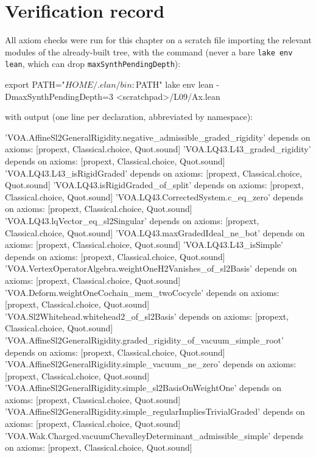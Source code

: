 \section{Verification record}\label{l09:sec:verification}

All axiom checks were run for this chapter on a scratch file importing the relevant modules of the
already-built tree, with the command (never a bare \texttt{lake env lean}, which can drop
\texttt{maxSynthPendingDepth}):

\begin{plaincode}
export PATH="$HOME/.elan/bin:$PATH"
lake env lean -DmaxSynthPendingDepth=3 <scratchpad>/L09/Ax.lean
\end{plaincode}

with output (one line per declaration, abbreviated by namespace):

\begin{plaincode}
'VOA.AffineSl2GeneralRigidity.negative_admissible_graded_rigidity' depends on axioms: [propext, Classical.choice, Quot.sound]
'VOA.LQ43.L43_graded_rigidity' depends on axioms: [propext, Classical.choice, Quot.sound]
'VOA.LQ43.L43_isRigidGraded' depends on axioms: [propext, Classical.choice, Quot.sound]
'VOA.LQ43.isRigidGraded_of_split' depends on axioms: [propext, Classical.choice, Quot.sound]
'VOA.LQ43.CorrectedSystem.c_eq_zero' depends on axioms: [propext, Classical.choice, Quot.sound]
'VOA.LQ43.lqVector_eq_sl2Singular' depends on axioms: [propext, Classical.choice, Quot.sound]
'VOA.LQ43.maxGradedIdeal_ne_bot' depends on axioms: [propext, Classical.choice, Quot.sound]
'VOA.LQ43.L43_isSimple' depends on axioms: [propext, Classical.choice, Quot.sound]
'VOA.VertexOperatorAlgebra.weightOneH2Vanishes_of_sl2Basis' depends on axioms: [propext, Classical.choice, Quot.sound]
'VOA.Deform.weightOneCochain_mem_twoCocycle' depends on axioms: [propext, Classical.choice, Quot.sound]
'VOA.Sl2Whitehead.whitehead2_of_sl2Basis' depends on axioms: [propext, Classical.choice, Quot.sound]
'VOA.AffineSl2GeneralRigidity.graded_rigidity_of_vacuum_simple_root' depends on axioms: [propext, Classical.choice, Quot.sound]
'VOA.AffineSl2GeneralRigidity.simple_vacuum_ne_zero' depends on axioms: [propext, Classical.choice, Quot.sound]
'VOA.AffineSl2GeneralRigidity.simple_sl2BasisOnWeightOne' depends on axioms: [propext, Classical.choice, Quot.sound]
'VOA.AffineSl2GeneralRigidity.simple_regularImpliesTrivialGraded' depends on axioms: [propext, Classical.choice, Quot.sound]
'VOA.Wak.Charged.vacuumChevalleyDeterminant_admissible_simple' depends on axioms: [propext, Classical.choice, Quot.sound]
\end{plaincode}

